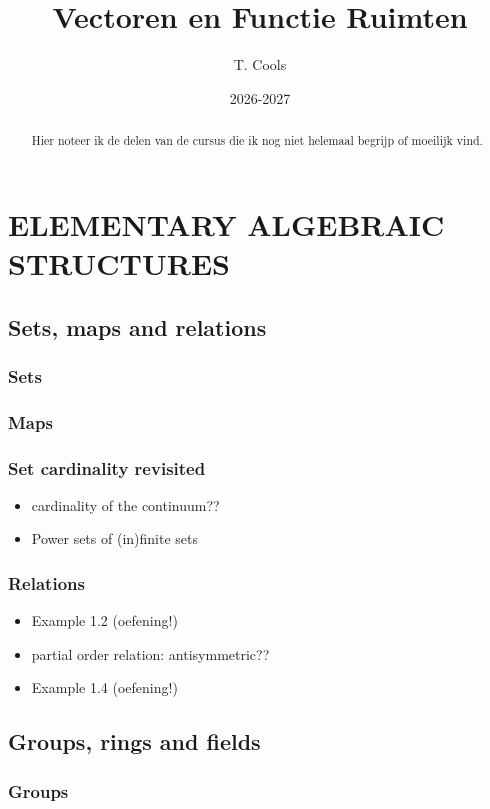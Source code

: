 \documentclass[a4paper,twoside]{article}
\title{Vectoren en Functie Ruimten}
\author{T. Cools}
\date{2026-2027}
\theoremstyle{definition}
\theoremstyle{plain}
\begin{document}
\maketitle

\begin{abstract}
   Hier noteer ik de delen van de cursus die ik nog niet helemaal begrijp of moeilijk vind.
\end{abstract}

\section{ELEMENTARY ALGEBRAIC STRUCTURES}
\subsection{Sets, maps and relations}
\subsubsection{Sets}
\subsubsection{Maps}
\subsubsection{Set cardinality revisited}
\begin{itemize}
    \item cardinality of the continuum??
    \item Power sets of (in)finite sets \cite{enwiki:power_set}
\end{itemize}
\subsubsection{Relations}
\begin{itemize}
    \item Example 1.2 (oefening!)
    \item partial order relation: antisymmetric??
    \item Example 1.4 (oefening!)
\end{itemize}
\subsection{Groups, rings and fields}
\subsubsection{Groups}
\end{document}
